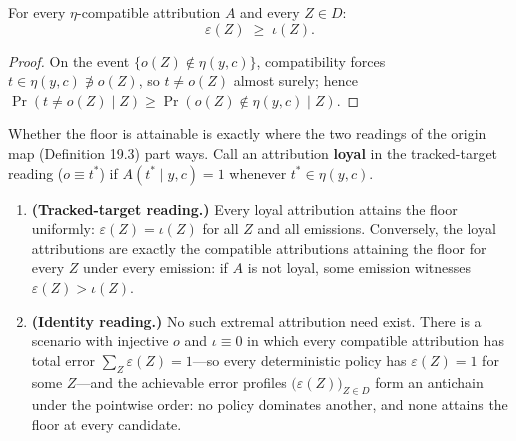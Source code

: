 
\begin{thmplain}

For every \(\eta\)-compatible attribution \(A\) and every \(Z \in D\):
\[
\varepsilon(Z) \;\ge\; \iota(Z).
\]
\end{thmplain}

\begin{proof}

On the event \(\{o(Z) \notin \eta(y,c)\}\), compatibility forces \(t \in \eta(y,c) \not\ni o(Z)\), so \(t \ne o(Z)\) almost surely; hence \(\Pr(t \ne o(Z) \mid Z) \ge \Pr(o(Z) \notin \eta(y,c) \mid Z)\).
\end{proof}

Whether the floor is attainable is exactly where the two readings of the origin map (Definition 19.3) part ways. Call an attribution \textbf{loyal} in the tracked-target reading (\(o \equiv t^*\)) if \(A(t^* \mid y,c) = 1\) whenever \(t^* \in \eta(y,c)\).

\begin{thmplain}

\par\nopagebreak

\begin{enumerate}
\def\labelenumi{\arabic{enumi}.}
\tightlist
\item
  \textbf{(Tracked-target reading.)} Every loyal attribution attains the floor uniformly: \(\varepsilon(Z) = \iota(Z)\) for all \(Z\) and all emissions. Conversely, the loyal attributions are exactly the compatible attributions attaining the floor for every \(Z\) under every emission: if \(A\) is not loyal, some emission witnesses \(\varepsilon(Z) > \iota(Z)\).
\item
  \textbf{(Identity reading.)} No such extremal attribution need exist. There is a scenario with injective \(o\) and \(\iota \equiv 0\) in which every compatible attribution has total error \(\sum_{Z} \varepsilon(Z) = 1\)---\hspace{0pt}so every deterministic policy has \(\varepsilon(Z) = 1\) for some \(Z\)---\hspace{0pt}and the achievable error profiles \(\big(\varepsilon(Z)\big)_{Z \in D}\) form an antichain under the pointwise order: no policy dominates another, and none attains the floor at every candidate.
\end{enumerate}
\end{thmplain}

